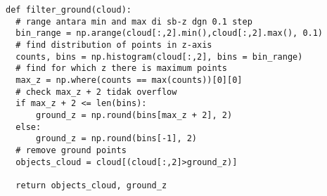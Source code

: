 \begin{lstlisting}
def filter_ground(cloud):
  # range antara min and max di sb-z dgn 0.1 step
  bin_range = np.arange(cloud[:,2].min(),cloud[:,2].max(), 0.1)
  # find distribution of points in z-axis
  counts, bins = np.histogram(cloud[:,2], bins = bin_range)
  # find for which z there is maximum points
  max_z = np.where(counts == max(counts))[0][0]
  # check max_z + 2 tidak overflow
  if max_z + 2 <= len(bins):
      ground_z = np.round(bins[max_z + 2], 2)
  else:
      ground_z = np.round(bins[-1], 2)
  # remove ground points
  objects_cloud = cloud[(cloud[:,2]>ground_z)]
  
  return objects_cloud, ground_z
\end{lstlisting}